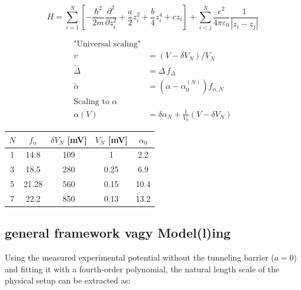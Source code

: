 \documentclass[prb,twocolumn,showpacs,preprintnumbers,amsmath,amssymb, superscriptaddress]{revtex4-2}
\newcommand{\n}{N}
\newcommand{\1}{{1\hspace*{-0.5ex} \textrm{l} \hspace*{0.5ex}}}
\begin{document}
\begin{equation}\label{dimfull_Hamiltonian}
H = \sum_{i = 1}^\n \left[ -\frac{\hbar^2}{2m}\frac{\partial^2}{\partial z_i^2} + \frac{a}{2} z_i^2 + \frac{b}{4}z_i^4 + {c} z_i  \right] + \sum_{i<j}^\n \frac{e^2}{4 \pi \varepsilon_0}\frac{1}{\left| z_i - z_j  \right|}
\end{equation}










\begin{align}
{\text{"Universal scaling"}}\\
v &= (V - \delta V_{\n})/V_\n \\
\tilde{\Delta} &= \Delta\, f_\Delta \\
\tilde{\alpha} &= (\alpha - \alpha_0^{(\n)}) f_{\alpha, \n} \\
{\text{Scaling to }} \alpha \\
\alpha(V) &= \delta\alpha_\n + \frac{1}{V_0} \left(V - \delta V_\n  \right)
\end{align}

\begin{table}[h!]
\begin{tabular}{|c|c|c|c|c|}
\hline
$\n$ & $f_\alpha$   & $\delta V_\n$ [mV] & $V_\n$ [mV]  & $\alpha_0$ \\ \hline
1 & 14.8  & 109  & 1    & 2.2     \\ \hline
3 & 18.5  & 280  & 0.25 & 6.9     \\ \hline
5 & 21.28 & 560  & 0.15 & 10.4    \\ \hline
7 & 22.2  & 850  & 0.13 & 13.2    \\ \hline
\end{tabular}
\end{table}
\subsection{general framework vagy Model(l)ing}\label{SubSect_Framework}
Using the measured experimental potential without the tunneling barrier ($a = 0$) and fitting it with a fourth-order polynomial, the natural length scale of the physical setup can be extracted as:
\end{document}
